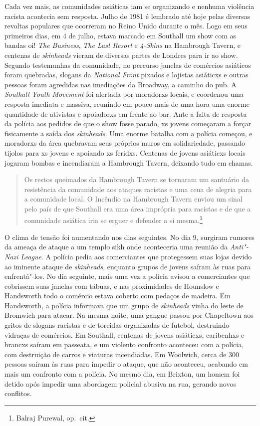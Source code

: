 Cada vez mais, as comunidades asiáticas iam se organizando e nenhuma violência racista acontecia sem resposta. Julho de 1981 é lembrado até hoje pelas diversas revoltas populares que ocorreram no Reino Unido durante o mês. Logo em seus primeiros dias, em 4 de julho, estava marcado em Southall um show com as bandas oi! \emph{The Business}, \emph{The Last Resort} e \emph{4-Skins} na Hambrough Tavern, e centenas de \emph{skinheads} vieram de diversas partes de Londres para ir ao show. Segundo testemunhas da comunidade, no percurso janelas de comércios asiáticos foram quebradas, slogans da \emph{National Front} pixados e lojistas asiáticxs e outras pessoas foram agredidas nas imediações da Broadway, a caminho do pub. A \emph{Southall Youth Movement} foi alertada por moradorxs locais, e coordenou uma resposta imediata e massiva, reunindo em pouco mais de uma hora uma enorme quantidade de ativistas e apoiadorxs em frente ao bar. Ante a falta de resposta da polícia aos pedidos de que o show fosse parado, xs jovens começaram a forçar fisicamente a saída dos \emph{skinheads}. Uma enorme batalha com a polícia começou, e moradorxs da área quebravam seus próprios muros em solidariedade, passando tijolos para xs jovens e apoiando xs feridxs. Centenas de jovens asiáticxs locais jogaram bombas e incendiaram a Hambrough Tavern, deixando tudo em chamas.

\begin{quote}
Os restos queimados da Hambrough Tavern se tornaram um santuário da resistência da comunidade aos ataques racistas e uma cena de alegria para a comunidade local. O Incêndio na Hambrough Tavern enviou um sinal pelo país de que Southall era uma área imprópria para racistas e de que a comunidade asiática iria se erguer e defender a si mesma.\footnote{Balraj Purewal, op.~cit.}
\end{quote}

O clima de tensão foi aumentando nos dias seguintes. No dia 9, surgiram rumores da ameaça de ataque a um templo sikh onde aconteceria uma reunião da \emph{Anti"-Nazi League}. A polícia pedia aos comerciantes que protegessem suas lojas devido ao iminente ataque de \emph{skinheads}, enquanto grupos de jovens saíram às ruas para enfrentá"-los. No dia seguinte, mais uma vez a polícia avisou a comerciantes que cobrissem suas janelas com tábuas, e nas proximidades de Hounslow e Handsworth todo o comércio estava coberto com pedaços de madeira. Em Handsworth, a polícia informava que um grupo de \emph{skinheads} vinha do leste de Bromwich para atacar. Na mesma noite, uma gangue passou por Chapeltown aos gritos de slogans racistas e de torcidas organizadas de futebol, destruindo vidraças de comércios. Em Southall, centenas de jovens asiáticxs, caribenhxs e brancxs saíram em passeata, e um violento confronto aconteceu com a polícia, com destruição de carros e viaturas incendiadas. Em Woolwich, cerca de 300 pessoas saíram às ruas para impedir o ataque, que não aconteceu, acabando em mais um confronto com a polícia. No mesmo dia, em Brixton, um homem foi detido após impedir uma abordagem policial abusiva na rua, gerando novos conflitos.


